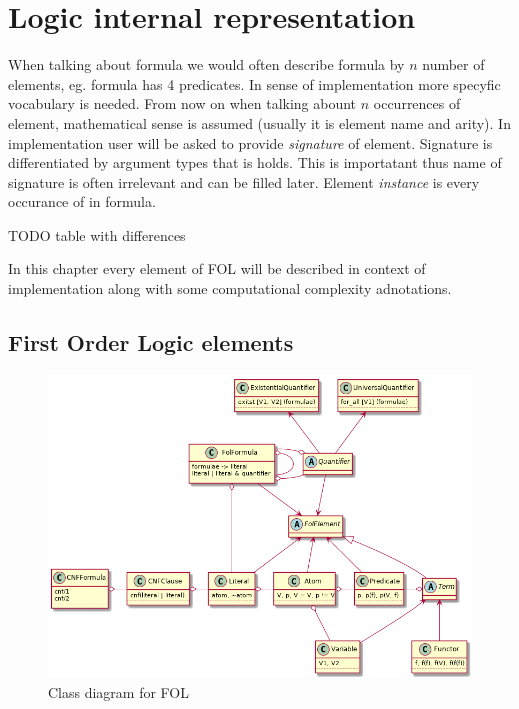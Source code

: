 \chapter{Logic internal representation}

When talking about formula we would often describe formula by $n$ number of elements, eg. formula has 4 predicates. In sense of implementation more specyfic vocabulary is needed. From now on when talking abount $n$ occurrences of element, mathematical sense is assumed (usually it is element name and arity). In implementation user will be asked to provide \textit{signature} of element. Signature is differentiated by argument types that is holds. This is importatant thus name of signature is often irrelevant and can be filled later. Element \textit{instance} is every occurance of in formula.

TODO table with differences

In this chapter every element of \gls{FOL} will be described in context of implementation along with some computational complexity adnotations.

\section{First Order Logic elements}

\begin{figure}[H]
\begin{centering}
  \includegraphics[width=\textwidth]{logic-formula-generator/fol/fol_elements.png}
  \caption{Class diagram for FOL}
\end{centering}
\end{figure}

